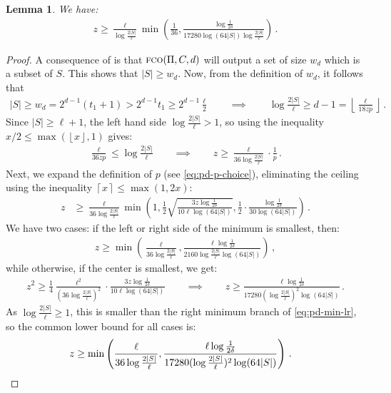 \documentclass[10pt,a4paper]{article}
\newtheorem{lemma}[theorem]{Lemma}
\theoremstyle{definition}
\theoremstyle{remark}
\newcommand{\ceil}[1]{{\left\lceil{#1}\right\rceil}}
\newcommand{\floor}[1]{{\left\lfloor{#1}\right\rfloor}}
\newcommand{\fco}{\textsc{fco}\xspace}
\newcommand{\rl}{\mathbf{\ell}}             %
\begin{document}
\begin{itemize}
\begin{itemize}
\begin{lemma}\label{lem:pd-z-lb} 
  We have:
  \begin{align*}
    z \ge \frac{\rl}{\log\frac{2|S|}{\rl}} \min\left(\frac{1}{36},
    \frac{\log\frac{1}{2\delta}}{17280 \log(64|S|) \log\frac{2|S|}{\rl}} \right) \,.
  \end{align*}
\end{lemma}
%
\begin{proof}%
  A consequence of  is that $\fco(\Pi, C, d)$ will
  output a set of size $w_d$ which is a subset of $S$. This shows that $|S|
  \ge w_d$.  Now, from the definition of $w_d$, it follows that
  \begin{align*}
    |S| \ge w_d = 2^{d-1} (t_1 + 1) > 2^{d-1} t_1 \ge 2^{d-1} \frac{\rl}{2} \qquad \implies \qquad \log \frac{2 |S|}{\rl} \ge d - 1 = \floor{\frac{\rl}{18 z p}} \,.
  \end{align*}
  Since $|S| \ge \rl + 1$, the left hand side $\log \frac{2 |S|}{\rl} > 1$, so using the inequality $x/2 \le \max(\floor{x}, 1)$ gives:
  \begin{align*}
    \frac{\rl}{36 z p} \le \log \frac{2 |S|}{\rl} \qquad \implies \qquad z \ge \frac{\rl}{36 \log \frac{2|S|}{\rl}} \cdot \frac{1}{p} \,.
  \end{align*}
  Next, we expand the definition of $p$ (see \cref{eq:pd-p-choice}), eliminating the ceiling using the inequality $\ceil{x} \le \max(1, 2 x)$:
  \begin{align*}
    z &\ge \frac{\rl}{36 \log \frac{2|S|}{\rl}} \min\left(1, \frac{1}{2} \sqrt{ \frac{3 z \log \frac{1}{2\delta}}{10 \rl \log(64 |S|) } }, \frac{1}{2} \cdot \frac{\log \frac{1}{2\delta}}{30 \log(64 |S|) }\right) \,.
  \end{align*}
  We have two cases: if the left or right side of the minimum is smallest, then:
  \begin{align}
    z \ge \min\left( \frac{\rl}{36 \log \frac{2|S|}{\rl}}, \frac{\rl \log \frac{1}{2\delta}}{2160 \log \frac{2|S|}{\rl} \log(64|S|)} \right) \,, \label{eq:pd-min-lr}
  \end{align}
  while otherwise, if the center is smallest, we get:
  \begin{align*}
    z^2 \ge  \frac{1}{4} \frac{\rl^2}{(36 \log \frac{2|S|}{\rl})^2} \cdot \frac{3 z \log \frac{1}{2\delta}}{10 \rl \log(64 |S|) } \qquad \implies \qquad z \ge \frac{\rl \log \frac{1}{2 \delta}}{17280 (\log \frac{2|S|}{\rl})^2 \log(64|S|)} \,.
  \end{align*}
  As $\log\frac{2|S|}{\rl} \ge 1$, this is smaller than the right minimum
  branch of \cref{eq:pd-min-lr}, so the common lower bound for all cases is:
  \begin{align*}
    z &\ge \min\left( \frac{\rl}{36 \log \frac{2|S|}{\rl}}, \frac{\rl \log \frac{1}{2 \delta}}{17280 (\log \frac{2|S|}{\rl})^2 \log(64|S|)} \right) \,. \qedhere
  \end{align*}
\end{proof}
% 



\end{itemize}
\end{itemize}
\end{document}

